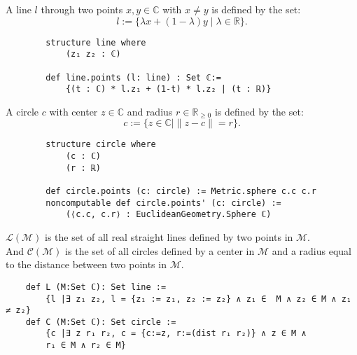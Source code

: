 \begin{frame}[fragile]
    \begin{definition}[Line]
        \label{def:line}
        A line $l$ through two points $x,y\in\mathbb{C}$ with $x\ne y$ is defined by the set: $$l:=\{\lambda x+(1-\lambda)y\mid\lambda\in\mathbb{R}\}.$$
    \end{definition}

    \begin{lstlisting}
        structure line where
            (z₁ z₂ : ℂ)
    
        def line.points (l: line) : Set ℂ:= 
            {(t : ℂ) * l.z₁ + (1-t) * l.z₂ | (t : ℝ)}
    \end{lstlisting}

\end{frame}

\begin{frame}[fragile]
    \begin{definition}[Circle]
        \label{def:circle}
        A circle $c$ with center $z\in\mathbb{C}$ and radius $r\in\mathbb{R}_{\ge 0}$ is defined by the set: $$c:=\{z\in\mathbb{C} \mid\|z-c\|=r\}.$$
    \end{definition}
    
    \begin{lstlisting}
        structure circle where
            (c : ℂ)
            (r : ℝ)
    
        def circle.points (c: circle) := Metric.sphere c.c c.r
        noncomputable def circle.points' (c: circle) := 
            (⟨c.c, c.r⟩ : EuclideanGeometry.Sphere ℂ)
    \end{lstlisting}
\end{frame}

\begin{frame}[fragile]    
    \begin{definition}
        \label{def:set_of_lines_and_circles}
        $\mathcal{L(M)}$ is the set of all real straight lines defined by two points in $\mathcal{M}$.\\
        And $\mathcal{C(M)}$ is the set of all circles defined by a center in $\mathcal{M}$ and a radius equal to the distance between two points in $\mathcal{M}$.
    \end{definition}

    \begin{lstlisting}
    def L (M:Set ℂ): Set line := 
        {l |∃ z₁ z₂, l = {z₁ := z₁, z₂ := z₂} ∧ z₁ ∈  M ∧ z₂ ∈ M ∧ z₁ ≠ z₂}
    def C (M:Set ℂ): Set circle := 
        {c |∃ z r₁ r₂, c = {c:=z, r:=(dist r₁ r₂)} ∧ z ∈ M ∧ 
        r₁ ∈ M ∧ r₂ ∈ M}
    \end{lstlisting}
\end{frame}


